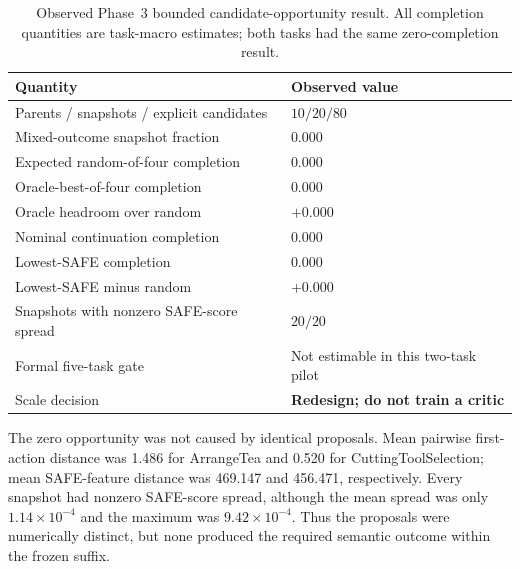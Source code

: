 \begin{table}[H]
\centering
\caption{Observed Phase~3 bounded candidate-opportunity result. All completion quantities are task-macro estimates; both tasks had the same zero-completion result.}
\label{tab:phase3-observed}
\small
\begin{tabularx}{\textwidth}{P{0.42\textwidth}Y}
\toprule
Quantity & Observed value \\
\midrule
Parents / snapshots / explicit candidates & $10 / 20 / 80$ \\
Mixed-outcome snapshot fraction & $0.000$ \\
Expected random-of-four completion & $0.000$ \\
Oracle-best-of-four completion & $0.000$ \\
Oracle headroom over random & $+0.000$ \\
Nominal continuation completion & $0.000$ \\
Lowest-SAFE completion & $0.000$ \\
Lowest-SAFE minus random & $+0.000$ \\
Snapshots with nonzero SAFE-score spread & $20/20$ \\
Formal five-task gate & Not estimable in this two-task pilot \\
Scale decision & \textbf{Redesign; do not train a critic} \\
\bottomrule
\end{tabularx}
\end{table}

The zero opportunity was not caused by identical proposals. Mean pairwise first-action distance was 1.486 for ArrangeTea and 0.520 for CuttingToolSelection; mean SAFE-feature distance was 469.147 and 456.471, respectively. Every snapshot had nonzero SAFE-score spread, although the mean spread was only $1.14\times10^{-4}$ and the maximum was $9.42\times10^{-4}$. Thus the proposals were numerically distinct, but none produced the required semantic outcome within the frozen suffix.

